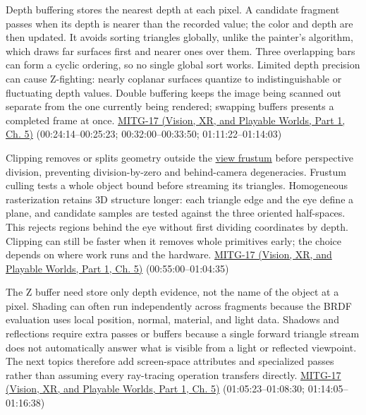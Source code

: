 Depth buffering stores the nearest depth at each pixel. A candidate fragment passes when its depth is nearer than the recorded value; the color and depth are then updated. It avoids sorting triangles globally, unlike the painter's algorithm, which draws far surfaces first and nearer ones over them. Three overlapping bars can form a cyclic ordering, so no single global sort works. Limited depth precision can cause Z-fighting: nearly coplanar surfaces quantize to indistinguishable or fluctuating depth values. Double buffering keeps the image being scanned out separate from the one currently being rendered; swapping buffers presents a completed frame at once. \href{../07-Vision-XR-and-Playable-Worlds-P01/main.pdf\#nameddest=04-visual-computing-ii-ch036-mitg-17---rasterization}{MITG-17 (Vision, XR, and Playable Worlds, Part 1, Ch. 5)} (00:24:14--00:25:23; 00:32:00--00:33:50; 01:11:22--01:14:03)

Clipping removes or splits geometry outside the \hyperref[appendix-1c07d64f5e70]{view frustum} before perspective division, preventing division-by-zero and behind-camera degeneracies. Frustum culling tests a whole object bound before streaming its triangles. Homogeneous rasterization retains 3D structure longer: each triangle edge and the eye define a plane, and candidate samples are tested against the three oriented half-spaces. This rejects regions behind the eye without first dividing coordinates by depth. Clipping can still be faster when it removes whole primitives early; the choice depends on where work runs and the hardware. \href{../07-Vision-XR-and-Playable-Worlds-P01/main.pdf\#nameddest=04-visual-computing-ii-ch036-mitg-17---rasterization}{MITG-17 (Vision, XR, and Playable Worlds, Part 1, Ch. 5)} (00:55:00--01:04:35)

The Z buffer need store only depth evidence, not the name of the object at a pixel. Shading can often run independently across fragments because the BRDF evaluation uses local position, normal, material, and light data. Shadows and reflections require extra passes or buffers because a single forward triangle stream does not automatically answer what is visible from a light or reflected viewpoint. The next topics therefore add screen-space attributes and specialized passes rather than assuming every ray-tracing operation transfers directly. \href{../07-Vision-XR-and-Playable-Worlds-P01/main.pdf\#nameddest=04-visual-computing-ii-ch036-mitg-17---rasterization}{MITG-17 (Vision, XR, and Playable Worlds, Part 1, Ch. 5)} (01:05:23--01:08:30; 01:14:05--01:16:38)

